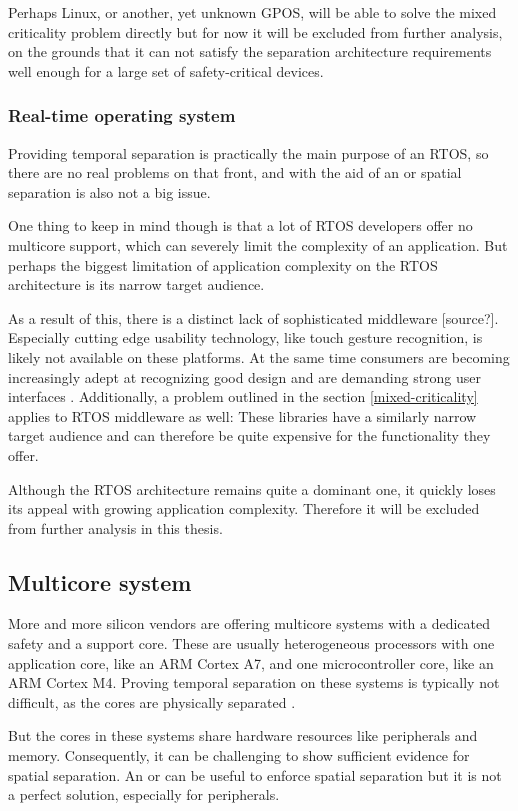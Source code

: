Perhaps Linux, or another, yet unknown GPOS, will be able to solve the mixed criticality problem directly but for now it will be excluded from further analysis, on the grounds that it can not satisfy the separation architecture requirements well enough for a large set of safety-critical devices.
\subsubsection{Real-time operating system}
Providing temporal separation is practically the main purpose of an RTOS, so there are no real problems on that front, and with the aid of an  or  spatial separation is also not a big issue.

One thing to keep in mind though is that a lot of RTOS developers offer no multicore support, which can severely limit the complexity of an application. But perhaps the biggest limitation of application complexity on the RTOS architecture is its narrow target audience.

As a result of this, there is a distinct lack of sophisticated middleware [source?]. Especially cutting edge usability technology, like touch gesture recognition, is likely not available on these platforms. At the same time consumers are becoming increasingly adept at recognizing good design and are demanding strong user interfaces \cite{HBR.September2015}.
Additionally, a problem outlined in the section \ref{mixed-criticality} applies to RTOS middleware as well: These libraries have a similarly narrow target audience and can therefore be quite expensive for the functionality they offer.

Although the RTOS architecture remains quite a dominant one, it quickly loses its appeal with growing application complexity. Therefore it will be excluded from further analysis in this thesis.
\subsection{Multicore system}
More and more silicon vendors are offering multicore systems with a dedicated safety and a support core. These are usually heterogeneous processors with one application core, like an ARM Cortex A7, and one microcontroller core, like an ARM Cortex M4. Proving temporal separation on these systems is typically not difficult, as the cores are physically separated \cite{Wittenstein.temporal.2017}.

But the cores in these systems share hardware resources like peripherals and memory. Consequently, it can be challenging to show sufficient evidence for spatial separation. An  or  can be useful to enforce spatial separation but it is not a perfect solution, especially for peripherals.
